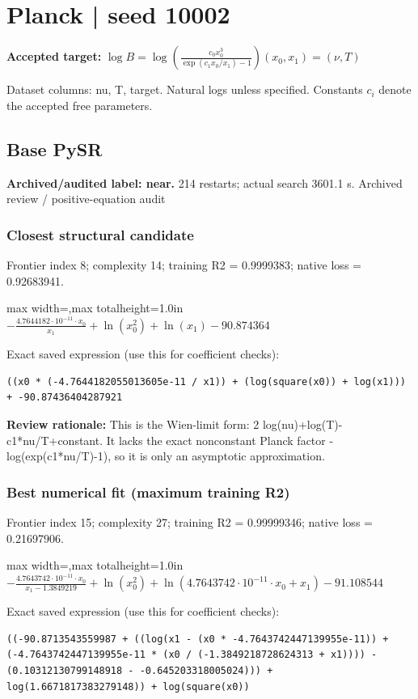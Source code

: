 \documentclass[10pt,letterpaper,landscape]{article}
\begin{document}
\section*{Planck | seed 10002}
\textbf{Accepted target:} $\displaystyle \log B=\log\!\left(\frac{c_0 x_0^3}{\exp(c_1x_0/x_1)-1}\right)$\hfill $(x_0,x_1)=(\nu,T)$\par
{\small Dataset columns: nu, T, target. Natural logs unless specified. Constants $c_i$ denote the accepted free parameters.}\par\medskip
\begin{minipage}[t]{0.485\textwidth}
\subsection*{Base PySR}
\textbf{Archived/audited label: near.} 214 restarts; actual search 3601.1 s.
{\small Archived review / positive-equation audit}
\subsubsection*{Closest structural candidate}
Frontier index 8; complexity 14; training R2 = 0.9999383; native loss = 0.92683941.
\begin{center}\begin{adjustbox}{max width=\linewidth,max totalheight=1.0in}$\displaystyle - \frac{4.7644182 \cdot 10^{-11} \cdot x_{0}}{x_{1}} + \ln{\left(x_{0}^{2} \right)} + \ln{\left(x_{1} \right)} - 90.874364$\end{adjustbox}\end{center}
{\scriptsize Exact saved expression (use this for coefficient checks):}
\begin{lstlisting}
((x0 * (-4.7644182055013605e-11 / x1)) + (log(square(x0)) + log(x1))) + -90.87436404287921
\end{lstlisting}
{\small\textbf{Review rationale:} This is the Wien-limit form: 2 log(nu)+log(T)-c1*nu/T+constant. It lacks the exact nonconstant Planck factor -log(exp(c1*nu/T)-1), so it is only an asymptotic approximation.}
\subsubsection*{Best numerical fit (maximum training R2)}
Frontier index 15; complexity 27; training R2 = 0.99999346; native loss = 0.21697906.
\begin{center}\begin{adjustbox}{max width=\linewidth,max totalheight=1.0in}$\displaystyle - \frac{4.7643742 \cdot 10^{-11} \cdot x_{0}}{x_{1} - 1.3849219} + \ln{\left(x_{0}^{2} \right)} + \ln{\left(4.7643742 \cdot 10^{-11} \cdot x_{0} + x_{1} \right)} - 91.108544$\end{adjustbox}\end{center}
{\scriptsize Exact saved expression (use this for coefficient checks):}
\begin{lstlisting}
((-90.8713543559987 + ((log(x1 - (x0 * -4.7643742447139955e-11)) + (-4.7643742447139955e-11 * (x0 / (-1.3849218728624313 + x1)))) - (0.10312130799148918 - -0.645203318005024))) + log(1.6671817383279148)) + log(square(x0))
\end{lstlisting}
\end{minipage}\hfill
\end{document}
